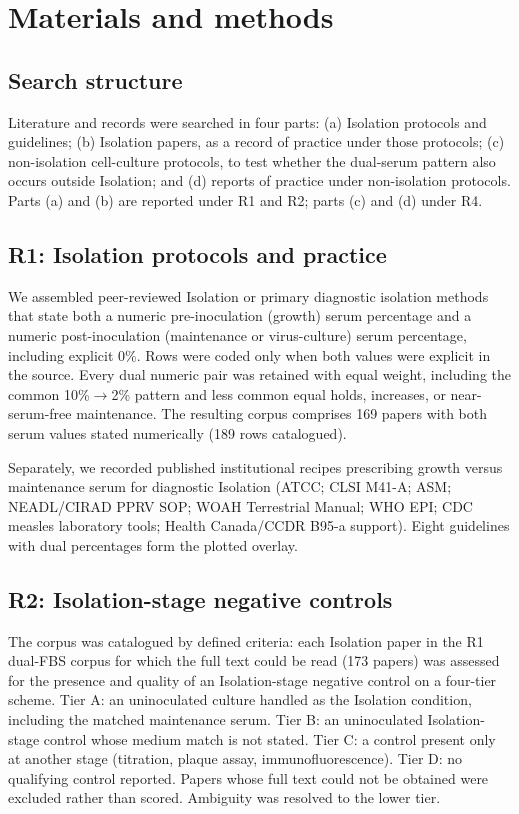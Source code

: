 \section*{Materials and methods}

\subsection*{Search structure}
Literature and records were searched in four parts: (a) Isolation protocols and guidelines; (b) Isolation papers, as a record of practice under those protocols; (c) non-isolation cell-culture protocols, to test whether the dual-serum pattern also occurs outside Isolation; and (d) reports of practice under non-isolation protocols. Parts (a) and (b) are reported under R1 and R2; parts (c) and (d) under R4.

\subsection*{R1: Isolation protocols and practice}
We assembled peer-reviewed Isolation or primary diagnostic isolation methods that state both a numeric pre-inoculation (growth) serum percentage and a numeric post-inoculation (maintenance or virus-culture) serum percentage, including explicit 0\%. Rows were coded only when both values were explicit in the source. Every dual numeric pair was retained with equal weight, including the common 10\%$\rightarrow$2\% pattern and less common equal holds, increases, or near-serum-free maintenance. The resulting corpus comprises 169 papers with both serum values stated numerically (189 rows catalogued).

Separately, we recorded published institutional recipes prescribing growth versus maintenance serum for diagnostic Isolation (ATCC; CLSI M41-A; ASM; NEADL/CIRAD PPRV SOP; WOAH Terrestrial Manual; WHO EPI; CDC measles laboratory tools; Health Canada/CCDR B95-a support). Eight guidelines with dual percentages form the plotted overlay.


\subsection*{R2: Isolation-stage negative controls}
The corpus was catalogued by defined criteria: each Isolation paper in the R1 dual-FBS corpus for which the full text could be read (173 papers) was assessed for the presence and quality of an Isolation-stage negative control on a four-tier scheme. Tier A: an uninoculated culture handled as the Isolation condition, including the matched maintenance serum. Tier B: an uninoculated Isolation-stage control whose medium match is not stated. Tier C: a control present only at another stage (titration, plaque assay, immunofluorescence). Tier D: no qualifying control reported. Papers whose full text could not be obtained were excluded rather than scored. Ambiguity was resolved to the lower tier.

